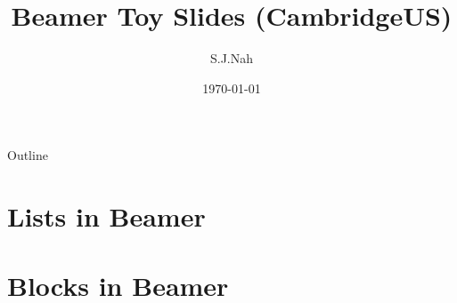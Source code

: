 \documentclass{beamer}
\title{Beamer Toy Slides (CambridgeUS)}
\author{S.J.Nah}
\date{\today}
\begin{document}
\begin{frame}
    \titlepage 
\end{frame}

\logo{}

\begin{frame}{Outline}
    \tableofcontents
\end{frame}

\section{Lists in Beamer}


\section{Blocks in Beamer}

\end{document}
